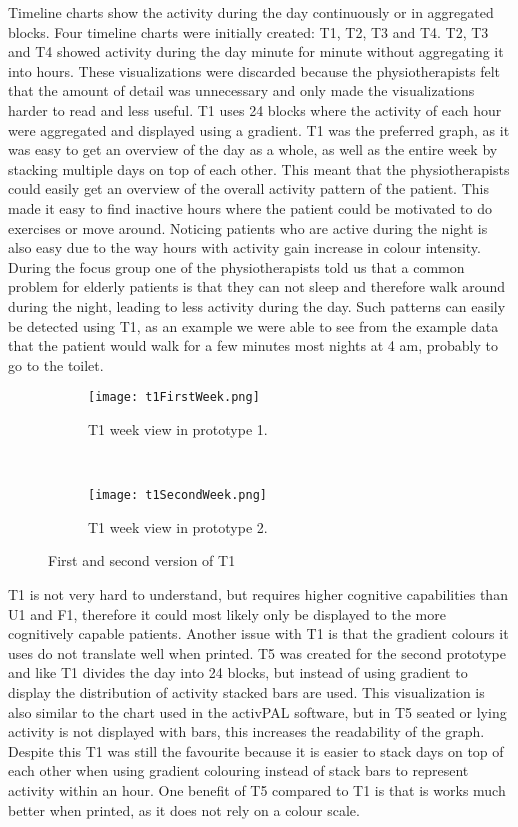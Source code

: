 Timeline charts show the activity during the day continuously or in aggregated blocks. Four timeline charts were initially created: T1, T2, T3 and T4. T2, T3 and T4 showed activity during the day minute for minute without aggregating it into hours. These visualizations were discarded because the physiotherapists felt that the amount of detail was unnecessary and only made the visualizations harder to read and less useful. T1 uses 24 blocks where the activity of each hour were aggregated and displayed using a gradient. T1 was the preferred graph, as it was easy to get an overview of the day as a whole, as well as the entire week by stacking multiple days on top of each other. This meant that the physiotherapists could easily get an overview of the overall activity pattern of the patient. This made it easy to find inactive hours where the patient could be motivated to do exercises or move around. Noticing patients who are active during the night is also easy due to the way hours with activity gain increase in colour intensity. During the focus group one of the physiotherapists told us that a common problem for elderly patients is that they can not sleep and therefore walk around during the night, leading to less activity during the day. Such patterns can easily be detected using T1, as an example we were able to see from the example data that the patient would walk for a few minutes most nights at 4 am, probably to go to the toilet.

\begin{figure}[h!]
  \centering
  \begin{subfigure}[b]{0.7\textwidth}
    \centering
    \texttt{[image: t1FirstWeek.png]}
    \caption{T1 week view in prototype 1.}
  \end{subfigure}
  \\
  \begin{subfigure}[b]{0.7\textwidth}
    \centering
    \texttt{[image: t1SecondWeek.png]}
    \caption{T1 week view in prototype 2.}
  \end{subfigure} 
  \caption{First and second version of T1}
  \label{fig:tComparison}
\end{figure} 

T1 is not very hard to understand, but requires higher cognitive capabilities than U1 and F1, therefore it could most likely only be displayed to the more cognitively capable patients. Another issue with T1 is that the gradient colours it uses do not translate well when printed. T5 was created for the second prototype and like T1 divides the day into 24 blocks, but instead of using gradient to display the distribution of activity stacked bars are used. This visualization is also similar to the chart used in the activPAL software, but in T5 seated or lying activity is not displayed with bars, this increases the readability of the graph. Despite this T1 was still the favourite because it is easier to stack days on top of each other when using gradient colouring instead of stack bars to represent activity within an hour. One benefit of T5 compared to T1 is that is works much better when printed, as it does not rely on a colour scale.

